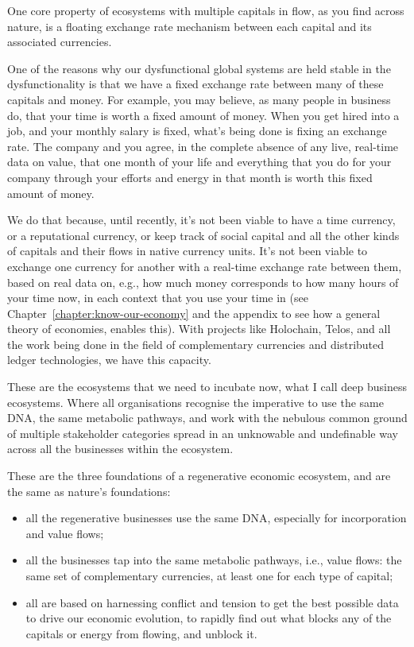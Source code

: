 One core property of ecosystems with multiple capitals  in flow, as you find across nature, is a floating exchange rate mechanism between each capital and its associated currencies. 


One of the reasons why our dysfunctional global systems are held stable in the dysfunctionality is that we have a fixed exchange rate between many of these capitals and money. For example, you may believe, as many people in business do, that your time is worth a fixed amount of money. When you get hired into a job, and your monthly salary is fixed, what's being done is fixing an exchange rate.  The company and you agree, in the complete absence of any live, real-time data on value, that one month of your life and everything that you do for your company through your efforts and energy in that month is worth this fixed amount of money.


We do that because, until recently, it's not been viable to have a time currency, or a reputational currency, or keep track of social capital and all the other kinds of capitals and their flows in native currency units. It’s not been viable to exchange one currency for another with a real-time exchange rate between them, based on real data on, e.g., how much money corresponds to how many hours of your time now, in each context that you use your time in (see Chapter~\ref{chapter:know-our-economy} and the appendix to see how a general theory of economies,  enables this). With projects like Holochain, Telos, and all the work being done in the field of complementary currencies and distributed ledger technologies, we have this capacity.


These are the ecosystems that we need to incubate now, what I call deep business ecosystems. Where all organisations recognise the imperative to use the same DNA, the same metabolic pathways, and work with the nebulous common ground of multiple stakeholder categories spread in an unknowable and undefinable way across all the businesses within the ecosystem.


These are the three foundations of a regenerative economic ecosystem, and are the same as nature's foundations: 


\begin{itemize}
\item all the regenerative businesses use the same DNA, especially for incorporation and value flows; 
\item all the businesses tap into the same metabolic pathways, i.e., value flows: the same set of complementary currencies, at least one for each type of capital; 
\item all are based on harnessing conflict and tension to get the best possible data to drive our economic evolution, to rapidly find out what blocks any of the capitals or energy from flowing, and unblock it. 
\label{list:ecosystem-principles}
\end{itemize}


